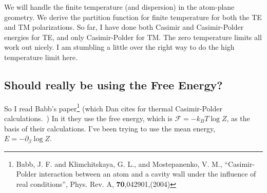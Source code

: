 We will handle the finite temperature (and dispersion) in the atom-plane geometry.
  We derive the partition function for finite temperature for both the TE and TM polarizations.
  So far, I have done both Casimir and Casimir-Polder energies for TE, and only Casimir-Polder for TM.
  The zero temperature limits all work out nicely.
  I am stumbling a little over the right way to do the high temperature limit here.  


\subsection{Should really be using the Free Energy?}

So I read Babb's paper\footnote{Babb, J. F. and Klimchitskaya, G. L., and Mostepanenko, V. M., 
``Casimir-Polder interaction between an atom and a cavity wall under the influence of real conditions'',
 Phys. Rev. A, \textbf{70},042901,(2004)} (which Dan cites for thermal Casimir-Polder calculations.~\cite{Babb2004})
  In it they use the free energy, which is $\mathcal{F} = -k_BT\log Z$, as the basis of their calculations.
  I've been trying to use the mean energy, $E= -\partial_\beta\log Z$. 




